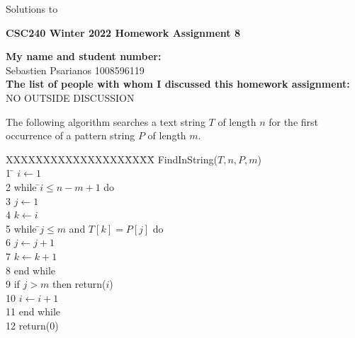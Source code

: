 \documentclass[11pt]{article}
\begin{document}
\begin{center}
\begin{solution}
Solutions to
\end{solution}

{\bf \Large \bf CSC240 Winter 2022 Homework Assignment 8}\\
\end{center}
{\bf My name and student number:}\\
Sebastien Psarianos 1008596119\\
{\bf The list of people with whom I discussed this homework assignment:}\\
NO OUTSIDE DISCUSSION\\

\begin{question}
The following algorithm searches a text string $T$ of length $n$ for
the first occurrence of a pattern string $P$ of length $m$.

\begin{tabbing}
XXXXXXXXXXXXXXXX\=XX\=XX\=\+\kill
FindInString($T,n,P,m$)\\
1 \hspace{2mm} \= $i \leftarrow 1$\\
2 \> while \=$i \leq n-m+1$ do\\
3 \> \> $j \leftarrow 1$\\
4 \> \> $k \leftarrow i$\\
5 \> \> while \=$j  \leq m$ and $T[k] = P[j]$ do\\
6 \> \> \> $j \leftarrow j+1$\\
7 \> \> \> $k \leftarrow k+1$\\
8 \> \> end while\\
9 \> \> if $j > m$ then return($i$)\\
10 \> \> $i \leftarrow i+1$ \\
11 \> end while\\
12 \> return(0)
\end{tabbing}
\end{question}
\end{document}
